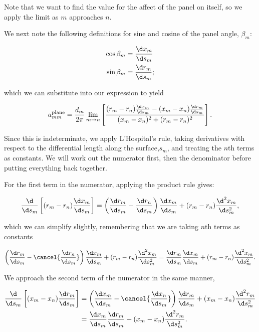 \noindent Note that we want to find the value for the affect of the panel on itself, so we apply the limit as \(m\) approaches \(n\).

We next note the following definitions for sine and cosine of the panel angle, \(\beta_m\):

\begin{align}
    \cos \beta_m  &= \frac{\d x_m}{\d s_m} \\
    \sin \beta_m  &= \frac{\d r_m}{\d s_m};
\end{align}

\noindent which we can substitute into our expression to yield

\begin{equation}
    a^\text{plane}_{mm} = \frac{d_m}{2 \pi} \lim_{m\rightarrow n} \left[\frac{(r_m - r_n) \frac{\d x_m}{\d s_m}  - (x_m - x_n)\frac{\d r_m}{\d s_m}}{(x_m - x_n)^2+(r_m - r_n)^2}\right].
\end{equation}

Since this is indeterminate, we apply L'Hospital's rule, taking derivatives with respect to the differential length along the surface,\(s_m\), and treating the \(n\)th terms as constants.
We will work out the numerator first, then the denominator before putting everything back together.

For the first term in the numerator, applying the product rule gives:

\begin{equation}
    \frac{\d}{\d s_m} \left[ (r_m-r_n)\frac{\d x_m}{\d s_m}\right] = \left(\frac{\d r_m}{\d s_m} - \frac{\d r_n}{\d s_m} \right) \frac{\d x_m}{\d s_m} + (r_m-r_n)\frac{\d^2 x_m}{\d s_m^2},
\end{equation}

\noindent which we can simplify slightly, remembering that we are taking \(n\)th terms as constants

\begin{equation}
 \left(\frac{\d r_m}{\d s_m} - \cancel{\frac{\d r_n}{\d s_m}} \right) \frac{\d x_m}{\d s_m} + (r_m-r_n)\frac{\d^2 x_m}{\d s_m^2} =  \frac{\d r_m}{\d s_m} \frac{\d x_m}{\d s_m} + (r_m-r_n)\frac{\d^2 x_m}{\d s_m^2}.
\end{equation}

We approach the second term of the numerator in the same manner,

\begin{equation}
    \begin{aligned}
    \frac{\d}{\d s_m} \left[ (x_m-x_n)\frac{\d r_m}{\d s_m}\right] &= \left(\frac{\d x_m}{\d s_m} - \cancel{\frac{\d x_n}{\d s_m}} \right) \frac{\d r_m}{\d s_m} + (x_m-x_n)\frac{\d^2 r_m}{\d s_m^2}\\
    &= \frac{\d x_m}{\d s_m} \frac{\d r_m}{\d s_m} + (x_m-x_n)\frac{\d^2 r_m}{\d s_m^2}.
    \end{aligned}
\end{equation}


